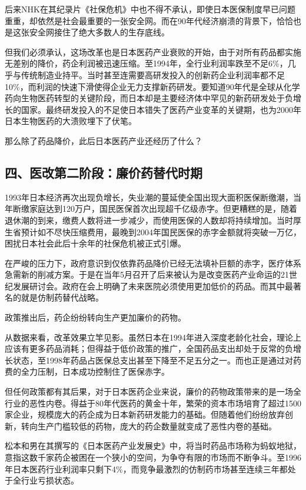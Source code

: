 后来NHK在其纪录片《社保危机》中也不得不承认，即使日本医保制度早已问题重重，却依然是社会最重要的一张安全网。而在90年代经济崩溃的背景下，恰恰也是这张安全网接住了绝大多数人的生存底线。

但我们必须承认，这场改革也是日本医药产业衰败的开始，由于对所有药品都实施无差别的降价，药企利润被迅速压缩。至1994年，全行业利润率跌至不足6\%，几乎与传统制造业持平。当时甚至连需要高研发投入的创新药企业利润率都不足10\%，而利润的快速下滑使得企业无力支撑新药研发。要知道90年代是全球从化学药向生物医药转型的关键阶段，而日本却是主要经济体中罕见的新药研发处于负增长的国家。最终研发投入的不足使日本错失了医药产业变革的关键期，也为2000年日本生物医药的大溃败埋下了伏笔。

那么除了药品降价，此后日本医药产业还经历了什么？

\subsection{四、医改第二阶段：廉价药替代时期}

1993年日本经济再次出现负增长，失业潮的蔓延使全国出现大面积医保断缴潮，当年断缴家庭达到120万户，国民医保首次出现超千亿级赤字。但更糟糕的是，随着退休潮的到来，缴费人数将进一步减少，而使用医保的人数却将持续增加。当时厚生省预计如不尽快压缩费用，最晚到2004年国民医保的赤字金额就将突破一万亿，困扰日本社会此后十余年的社保危机被正式引爆。

在严峻的压力下，政府意识到仅依靠药品降价已经无法填补巨额的赤字，医疗体系急需新的削减方案。于是在当年5月召开了后来被认为是改变医药产业命运的21世纪发展研讨会。政府在会上明确了未来医院必须使用更加低价的药品。而其中最著名的就是仿制药替代战略。

政策推出后，药企纷纷转向生产更加廉价的药物。

从数据来看，改革效果立竿见影。虽然日本在1994年进入深度老龄化社会，理论上应该有更多药品消耗；但得益于低价政策的推广，全国药品支出却处于反常的负增长状态，至1998年药品占医保总支出甚至下降至不足五分之一。而也正是通过对药费的全力压制，日本成功控制住了医保赤字。

但任何政策都有其后果，对于日本医药企业来说，廉价的药物政策带来的是一场全行业的恶性内卷。得益于80年代医药的黄金十年，繁荣的资本市场培育了超过1500家企业，规模庞大的药企成为日本新药研发能力的基础。但随着他们纷纷放弃创新，转向生产门槛较低的药物，庞大的药企数量就变成了恶性内卷的基础。

松本和男在其撰写的《日本医药产业发展史》中，将当时药品市场称为蚂蚁地狱，意指这数千家药企被困在一个狭小的空间，为争夺有限的市场而不断争斗。至1996年日本医药行业利润率只剩下4\%，而竞争最激烈的仿制药市场甚至连续三年都处于全行业亏损状态。

